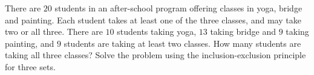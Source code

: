 There are $20$ students in an after-school program offering classes in yoga, bridge and painting. Each student takes at least one of the three classes, and may take two or all three. There are $10$ students taking yoga, $13$ taking bridge and $9$ taking painting, and $9$ students are taking at least two classes. How many students are taking all three classes? Solve the problem using the inclusion-exclusion principle for three sets.
